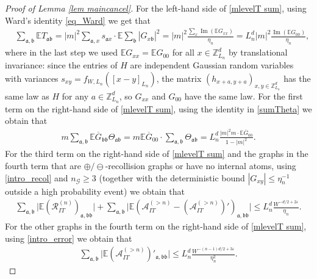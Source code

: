 \documentclass{article}
\newcommand{\1}{\mathds{1}}
\numberwithin{equation}{section}
\newcommand{\e}{{\varepsilon}}
\newcommand{\fa}{{\mathfrak a}}
\newcommand{\fb}{{\mathfrak b}}
\renewcommand{\cal}{\mathcal}
\newcommand{\wt}{\widetilde}
\renewcommand{\leq}{\leqslant}
\renewcommand{\geq}{\geqslant}
\renewcommand{\le}{\leq}
\renewcommand{\ge}{\geq}
\newcommand{\E}{\mathbb{E}}
\newcommand{\Z}{\mathbb{Z}}
\DeclareMathOperator{\im}{Im}
\theoremstyle{plain} %
\theoremstyle{remark}
\newcommand{\PITn}{{\mathcal R_{IT}^{(n)}}}
\newcommand{\AITn}{{\mathcal A_{IT}^{(>n)}}}
\begin{document}
\begin{proof}[Proof of Lemma \ref{lem maincancel}]
For the left-hand side of \eqref{mlevelT sum}, using Ward's identity \eqref{eq_Ward} we get that 
\begin{align}\label{Rcancel10}
&\sum_{\fa,\fb} \mathbb E T_{\fa \fb} = |m|^2 \sum_{\fa, x}s_{\fa x}\cdot \mathbb E \sum_\fb |G_{x\fb}|^2 = |m|^2 \frac{ \sum_{x}\im  \left(\mathbb E G_{xx}\right)}{\eta_n} =L_n^d |m|^2 \frac{\im  \left(\mathbb E G_{00}\right)}{\eta_n},   
\end{align}
where in the last step we used $\mathbb E G_{xx}= \mathbb E G_{00}$ for all $x\in \Z_{L_n}^d$ by translational invariance: since the entries of $H$ are independent Gaussian random variables with variances $s_{xy}=f_{W,L_n}([x-y]_{L_n})$, the matrix $(h_{x+a,y+a})_{x,y\in \Z_{L_n}^d}$ has the same law as $H$ for any $a\in \Z_{L_n}^d$, so $G_{xx}$ and $G_{00}$ have the same law.
For the first term on the right-hand side of \eqref{mlevelT sum}, using the identity in \eqref{sumTheta} we obtain that 
\begin{align}\label{Rcancel20}
 m  \sum_{\fa,\fb}\E\overline G_{\fb\fb} \Theta_{\fa\fb} = m \mathbb E \overline G_{00} \cdot \sum_{\fa,\fb}\Theta_{\fa\fb}  = L_n^d\frac{|m|^2 m \cdot \mathbb E \overline G_{00}}{1-|m|^2} .
\end{align}
 For the third term on the right-hand side of \eqref{mlevelT sum} and the graphs in the fourth term that are $\oplus/\ominus$-recollision graphs or have no internal atoms, using \eqref{intro_recol} and $n_{\cal G}\ge 3$ (together with the deterministic bound $|G_{xy}|\le \eta_n^{-1}$ outside a high probability event) we obtain that %
\begin{align}\label{Rcancel30}
\sum_{\fa,\fb}\big|\E(\PITn)_{\fa,\fb\fb}\big|+\sum_{\fa,\fb}\big|\E(\AITn-(\AITn)')_{\fa,\fb\fb}\big| \le L_n^d \frac{W^{-d/2+2\e}}{\eta_n}.
\end{align}
For the other graphs in the fourth term on the right-hand side of \eqref{mlevelT sum}, using \eqref{intro_error} we obtain that %
\begin{align}\label{Rcancel40}
\sum_{\fa,\fb}\big|  \E(\AITn)'_{\fa,\fb\fb}\big| \le L^d_n\frac{W^{-(n-1)d/2+3\e}}{\eta_n^2}.
\end{align}

\end{proof}
\end{document}
